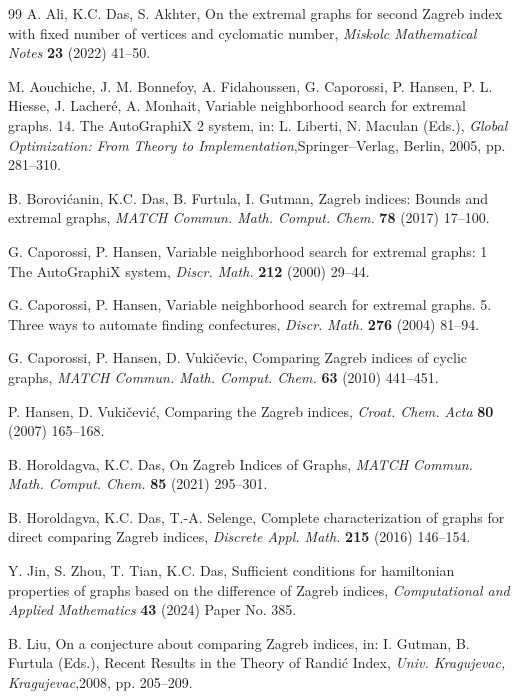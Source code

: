 \documentclass[12pt]{article}
\begin{document}
\begin{thebibliography}{99}
 A. Ali, K.C. Das, S. Akhter, On the extremal graphs for second Zagreb index with fixed number of vertices and cyclomatic number, {\it Miskolc Mathematical Notes} {\bf 23} (2022) 41--50. 
    
   M. Aouchiche, J. M. Bonnefoy, A. Fidahoussen, G. Caporossi, P. Hansen, P. L. Hiesse, J. Lacher\'e, A. Monhait, Variable neighborhood search for extremal graphs. 14. The AutoGraphiX 2 system, in: L. Liberti, N. Maculan (Eds.), {\it Global Optimization: From Theory to Implementation},Springer–Verlag, Berlin, 2005, pp. 281–310.

  B. Borovi\'canin, K.C.  Das, B.  Furtula, I.  Gutman,  Zagreb indices: Bounds and extremal graphs, {\it MATCH Commun. Math. Comput. Chem.} {\bf 78} (2017)  17--100. 

 G. Caporossi, P. Hansen, Variable neighborhood search for extremal graphs: 1 The AutoGraphiX system, {\it Discr. Math.} {\bf 212} (2000)  29--44.

 G. Caporossi, P. Hansen, Variable neighborhood search for extremal graphs. 5. Three ways to automate ﬁnding confectures, {\it Discr. Math.} {\bf 276} (2004) 81--94.

 G. Caporossi, P. Hansen, D. Vuki\v{c}evic, Comparing Zagreb indices of cyclic graphs, {\it MATCH Commun. Math. Comput. Chem.} {\bf63} (2010) 441--451.
    
 P. Hansen, D. Vuki\v{c}evi\'c, Comparing the Zagreb indices, {\it Croat. Chem. Acta} {\bf 80} (2007) 165--168.
    
  B. Horoldagva, K.C.  Das,  On Zagreb Indices of Graphs, {\it MATCH Commun. Math. Comput. Chem.} {\bf 85} (2021)  295--301. 
    
 B. Horoldagva, K.C.  Das, T.-A.  Selenge,  Complete characterization of graphs for direct comparing Zagreb indices, {\it Discrete Appl. Math.} {\bf 215} (2016)  146--154. 

 Y. Jin, S. Zhou, T.  Tian, K.C.   Das,  Sufficient conditions for hamiltonian properties of graphs based on the difference of Zagreb indices, {\it Computational and Applied Mathematics} {\bf 43} (2024) Paper No. 385. 

 B. Liu, On a conjecture about comparing Zagreb indices, in: I. Gutman, B. Furtula (Eds.), Recent Results in the Theory of Randi\'c Index, {\it Univ. Kragujevac, Kragujevac},2008, pp. 205–209.


\end{thebibliography}
\end{document}
